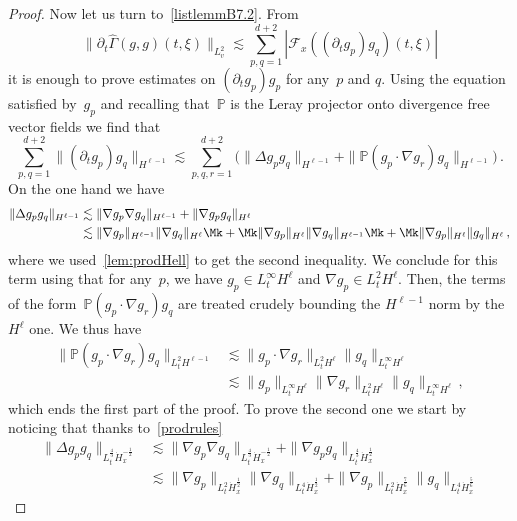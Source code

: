 \begin{proof}
Now let us turn to~\eqref{listlemmB7.2}. From
\begin{equation}\label{lem:hatGamma(ii)}
\big\|\partial_t\widehat {\Gamma}(g,g)({t},\xi)\big\|_{L^2_v} \lesssim\sum_{p,q=1}^{d+2} |\mathcal{F}_x({(\partial_t g_{p }) g_{q }})(t,\xi)|
\end{equation}
it is enough to prove estimates on $(\partial_t g_p)g_p$ for any~$p$ and $q$. Using the equation satisfied by~$g_p$ and recalling that~${\mathbb P}$ is the Leray projector onto divergence free vector fields we find that
\[
\sum_{p,q=1}^{d+2} \|(\partial_t g_{p }) g_{q }\|_{H^{\ell-1}} \lesssim\sum_{p,q,r=1}^{d+2}\Big(\|\Delta g_p g_q\|_{H^{\ell-1} } + \|{\mathbb P}(g_p \cdot\nabla g_r)g_q\|_{H^{\ell-1} }\Big)\,.
\]
On the one hand we have
\begin{equation}\label{eq:Deltagg}
\begin{aligned}
\|\Delta g_p g_q\|_{H^{\ell-1} }
&\lesssim \|\nabla g_p \nabla g_q\|_{H^{\ell-1} } + \|\nabla g_p g_q\|_{H^\ell} \\
&\lesssim \|\nabla g_p\|_{H^{\ell-1} } \|\nabla g_q\|_{H^\ell} \Mk+\Mk \|\nabla g_p\|_{H^\ell} \|\nabla g_q\|_{H^{\ell-1} } \Mk+\Mk \|\nabla g_p\|_{H^\ell} \|g_q\|_{H^\ell}\,,
\end{aligned}
\end{equation}
where we used~\eqref{lem:prodHell} to get the second inequality. We conclude for this term using that for any~$p$, we have $g_p \in L^\infty_t H^\ell$ and $\nabla g_p \in L^2_t H^\ell $. Then, the terms of the form~${\mathbb P}(g_p \cdot\nabla g_r)g_q$ are treated crudely bounding the $H^{\ell-1} $ norm by the $H^\ell$ one. We thus have
\begin{align*}
\|{\mathbb P}(g_p \cdot\nabla g_r)g_q\|_{L^2_t H^{\ell-1} } &\lesssim \|g_p\cdot\nabla g_r\|_{L^2_t H^\ell } \|g_q\|_{L^\infty_t H^\ell}\\
&\lesssim \| g_p\|_{L^\infty_t H^\ell} \| \nabla g_r\|_{L^2_t H^\ell} \|g_q\|_{L^\infty_t H^\ell} \,,
\end{align*}
which ends the first part of the proof. To prove the second one we start by noticing that thanks to~\eqref{prodrules}
\begin{align*}
\| \Delta g_p g_q\|_{L^\frac43_{t} \dot H^{-\frac12}_{x} }& \lesssim \|\nabla g_p \nabla g_q\|_{L^\frac43_{t} \dot H^{-\frac12}_{x}} + \|\nabla g_p g_q\|_{L^\frac43_{t} \dot H^{ \frac12}_{x} }\\
& \lesssim \|\nabla g_p\|_{L^2_{t} \dot H^{ \frac12}_{x}} \| \nabla g_q\|_{L^4_{t} \dot H^{ \frac12}_{x}} + \|\nabla g_p\|_{L^2_{t} \dot H^{ \frac76}_{x}} \| g_q\|_{L^4_{t} \dot H^{ \frac56}_{x}}

\end{align*}
\end{proof}
